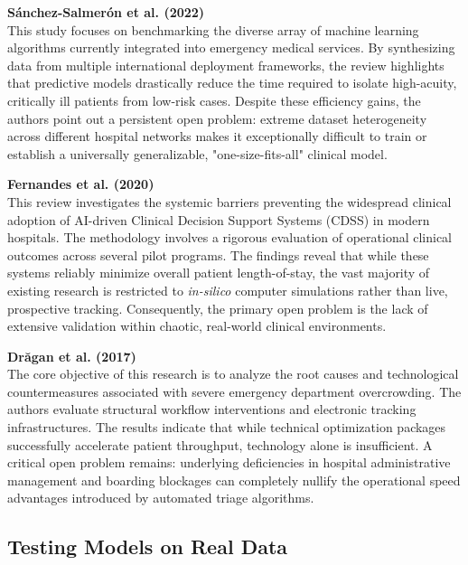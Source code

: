 \documentclass{article}
\begin{document}
\vspace{0.3cm}
\noindent \textbf{Sánchez-Salmerón et al. (2022) \cite{Sanchez2022}} \\
This study focuses on benchmarking the diverse array of machine learning algorithms currently integrated into emergency medical services. By synthesizing data from multiple international deployment frameworks, the review highlights that predictive models drastically reduce the time required to isolate high-acuity, critically ill patients from low-risk cases. Despite these efficiency gains, the authors point out a persistent open problem: extreme dataset heterogeneity across different hospital networks makes it exceptionally difficult to train or establish a universally generalizable, "one-size-fits-all" clinical model.

\vspace{0.3cm}
\noindent \textbf{Fernandes et al. (2020) \cite{FernandesReview}} \\
This review investigates the systemic barriers preventing the widespread clinical adoption of AI-driven Clinical Decision Support Systems (CDSS) in modern hospitals. The methodology involves a rigorous evaluation of operational clinical outcomes across several pilot programs. The findings reveal that while these systems reliably minimize overall patient length-of-stay, the vast majority of existing research is restricted to \textit{in-silico} computer simulations rather than live, prospective tracking. Consequently, the primary open problem is the lack of extensive validation within chaotic, real-world clinical environments.

\vspace{0.3cm}
\noindent \textbf{Drăgan et al. (2017) \cite{Dragan}} \\
The core objective of this research is to analyze the root causes and technological countermeasures associated with severe emergency department overcrowding. The authors evaluate structural workflow interventions and electronic tracking infrastructures. The results indicate that while technical optimization packages successfully accelerate patient throughput, technology alone is insufficient. A critical open problem remains: underlying deficiencies in hospital administrative management and boarding blockages can completely nullify the operational speed advantages introduced by automated triage algorithms.

\subsection{Testing Models on Real Data}
\end{document}
